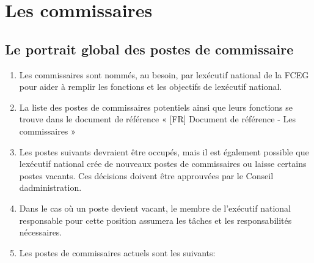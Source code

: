 \section{Les commissaires}
\label{les-commissaires}

\subsection{Le portrait global des postes de commissaire}
\label{le-portrait-global-des-postes-de-commissaire}

\begin{enumerate}
 \item
  Les commissaires sont nommés, au besoin, par l\textquotesingle exécutif national de la FCEG pour aider à remplir les fonctions et les objectifs de l\textquotesingle exécutif national.
 \item
  La liste des postes de commissaires potentiels ainsi que leurs fonctions se trouve dans le document de référence « {[}FR{]} Document de référence - Les commissaires »
 \item
  Les postes suivants devraient être occupés, mais il est également possible que l\textquotesingle exécutif national crée de nouveaux postes de commissaires ou laisse certains postes vacants. Ces décisions doivent être approuvées par le Conseil d\textquotesingle administration.
 \item
  Dans le cas où un poste devient vacant, le membre de l'exécutif national responsable pour cette position assumera les tâches et les responsabilités nécessaires.
 \item
  Les postes de commissaires actuels sont les suivants:


\end{enumerate}
